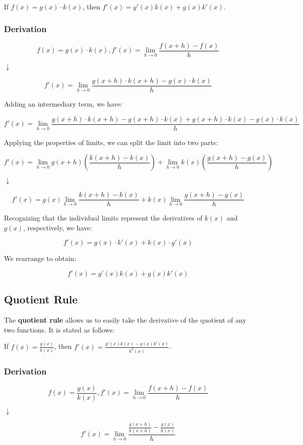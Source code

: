 \documentclass[11pt]{article}
\begin{document}
\begin{center}
If $f(x) = g(x) \cdot k(x)$, then $f'(x) = g'(x)k(x) + g(x)k'(x)$.
\end{center}

\subsubsection{Derivation}

\[f(x) = g(x) \cdot k(x), f'(x) = \lim_{{h \to 0}} \frac{{f(x + h) - f(x)}}{{h}}\]
\begin{center}
$\downarrow$
\end{center}
\[f'(x) = \lim_{{h \to 0}} \frac{{g(x + h) \cdot k(x + h) - g(x) \cdot k(x)}}{{h}}\]

Adding an intermediary term, we have:

\[f'(x) = \lim_{{h \to 0}} \frac{{g(x + h) \cdot k(x + h) - g(x + h) \cdot k(x) + g(x + h) \cdot k(x) - g(x) \cdot k(x)}}{{h}}\]

Applying the properties of limits, we can split the limit into two parts:

\[ f'(x) = \lim_{{h \to 0}} g(x + h) (\frac{k(x + h) - k(x)}{h}) + \lim_{{h \to 0}} k(x) (\frac{g(x + h) - g(x) }{h})\]
\begin{center}
$\downarrow$
\end{center}
\[ f'(x) = g(x) \lim_{{h \to 0}}\frac{k(x + h) - k(x)}{h} + k(x) \lim_{{h \to 0}}\frac{g(x + h) - g(x) }{h}\]

Recognizing that the individual limits represent the derivatives of \(k(x)\) and \(g(x)\), respectively, we have:

\[f'(x) = g(x) \cdot k'(x) + k(x) \cdot g'(x)\]

We rearrange to obtain:

\[f'(x) = g'(x)k(x) + g(x)k'(x)\]


\subsection{Quotient Rule}
The \textbf{quotient rule} allows us to easily take the derivative of the quotient of any two functions. It is stated as follows: 

\begin{center}
If $f(x) = \frac{g(x)}{k(x)}$, then $f'(x) = \frac{g'(x)k(x)-g(x)k'(x)}{k^2(x)}$.
\end{center}

\subsubsection{Derivation}
\[f(x) = \frac{g(x)}{k(x)}, f'(x) = \lim_{{h \to 0}} \frac{{f(x + h) - f(x)}}{{h}}\]
\begin{center}
$\downarrow$
\end{center}
\[f'(x) = \lim_{{h \to 0}} \frac{\frac{g(x+h)}{k(x+h)}-\frac{g(x)}{k(x)}}{{h}}\]
\end{document}
